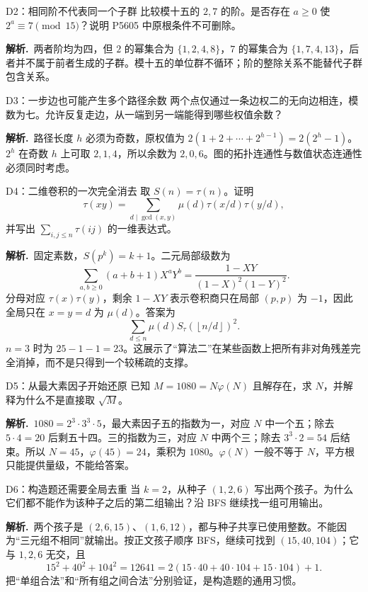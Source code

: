 \documentclass[UTF8,a4paper,11pt,twoside,openright,fontset=fandol]{ctexbook}
\theoremstyle{definition}
\newcommand{\floor}[1]{\left\lfloor #1\right\rfloor}
\newcommand{\sol}{\par\noindent\textbf{解析.}\ }
\begin{document}
\begin{problem}{D2：相同阶不代表同一个子群}
比较模十五的 $2,7$ 的阶。是否存在 $a\ge0$ 使 $2^a\equiv7\pmod{15}$？说明 P5605 中原根条件不可删除。
\end{problem}

\sol 两者阶均为四，但 $2$ 的幂集合为 $\{1,2,4,8\}$，$7$ 的幂集合为 $\{1,7,4,13\}$，后者并不属于前者生成的子群。模十五的单位群不循环；阶的整除关系不能替代子群包含关系。


\begin{problem}{D3：一步边也可能产生多个路径余数}
两个点仅通过一条边权二的无向边相连，模数为七。允许反复走边，从一端到另一端能得到哪些权值余数？
\end{problem}

\sol 路径长度 $h$ 必须为奇数，原权值为 $2(1+2+\cdots+2^{h-1})=2(2^h-1)$。$2^h$ 在奇数 $h$ 上可取 $2,1,4$，所以余数为 $2,0,6$。图的拓扑连通性与数值状态连通性必须同时考虑。


\begin{problem}{D4：二维卷积的一次完全消去}
取 $S(n)=\tau(n)$。证明
\[
 \tau(xy)=\sum_{d\mid\gcd(x,y)}\mu(d)\tau(x/d)\tau(y/d),
\]
并写出 $\sum_{i,j\le n}\tau(ij)$ 的一维表达式。
\end{problem}

\sol 固定素数，$S(p^k)=k+1$。二元局部级数为
\[
 \sum_{a,b\ge0}(a+b+1)X^aY^b
 =\frac{1-XY}{(1-X)^2(1-Y)^2}.
\]
分母对应 $\tau(x)\tau(y)$，剩余 $1-XY$ 表示卷积商只在局部 $(p,p)$ 为 $-1$，因此全局只在 $x=y=d$ 为 $\mu(d)$。答案为
\[
 \sum_{d\le n}\mu(d)S_\tau(\floor{n/d})^2.
\]
$n=3$ 时为 $25-1-1=23$。这展示了“算法二”在某些函数上把所有非对角残差完全消掉，而不是只得到一个较稀疏的支撑。


\begin{problem}{D5：从最大素因子开始还原}
已知 $M=1080=N\varphi(N)$ 且解存在，求 $N$，并解释为什么不是直接取 $\sqrt M$。
\end{problem}

\sol $1080=2^3\cdot3^3\cdot5$，最大素因子五的指数为一，对应 $N$ 中一个五；除去 $5\cdot4=20$ 后剩五十四。三的指数为三，对应 $N$ 中两个三；除去 $3^3\cdot2=54$ 后结束。所以 $N=45$，$\varphi(45)=24$，乘积为 $1080$。$\varphi(N)$ 一般不等于 $N$，平方根只能提供量级，不能给答案。


\begin{problem}{D6：构造题还需要全局去重}
当 $k=2$，从种子 $(1,2,6)$ 写出两个孩子。为什么它们都不能作为该种子之后的第二组输出？沿 BFS 继续找一组可用输出。
\end{problem}

\sol 两个孩子是 $(2,6,15)$、$(1,6,12)$，都与种子共享已使用整数。不能因为“三元组不相同”就输出。按正文孩子顺序 BFS，继续可找到 $(15,40,104)$；它与 $1,2,6$ 无交，且
\[
15^2+40^2+104^2=12641=2(15\cdot40+40\cdot104+15\cdot104)+1.
\]
把“单组合法”和“所有组之间合法”分别验证，是构造题的通用习惯。
\end{document}
